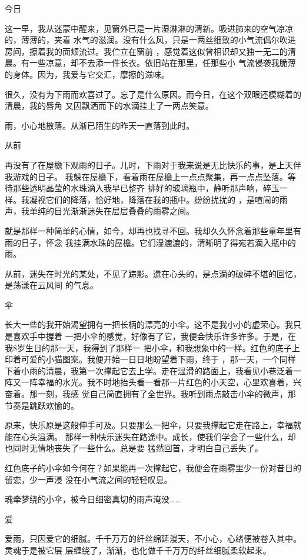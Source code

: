\documentclass[12pt,a4paper]{article}
\newcommand{\subpart}[1]{
	\begingroup \par
	\vspace{1ex} \centering #1
	\par \endgroup \nopagebreak[4]
}
\begin{document}
		\subpart{今日}
		这一早，我从迷蒙中醒来，见窗外已是一片湿淋淋的清新。吸进肺来的空气凉凉的，薄薄的，夹着
	水气的滋润。没有什么风，只是一两丝细致的小气流偶尔吹进房间，擦着我的面颊流过。我伫立在窗前
	，感觉着这似曾相识却又独一无二的清晨。有一些凉意，却不去添一件长衣。依旧站在那里，任那些小
	气流侵袭我脆薄的身体。因为，我爱与它交汇，摩擦的滋味。

		很久，没有为下雨而欢喜过了。忘了是什么原因。而今日，在这个双眼还模糊着的清晨，我的唇角
	又因飘洒而下的水滴挂上了一两点笑意。

		雨，小心地散落。从渐已陌生的昨天一直落到此时。

		\subpart{从前}
		再没有了在屋檐下观雨的日子。儿时，下雨对于我来说是无比快乐的事，是上天伴我游戏的日子。
	我躲在屋檐下，看着雨在屋檐上一点点聚集，再一点点坠落。等待那些透明晶莹的水珠滴入我早已整齐
	排好的玻璃瓶中，静听那声响，碎玉一样。我凝视它们的降落，恰好地，降落在我的瓶中。纷纷扰扰的
	，是喧闹的雨声，我单纯的目光渐渐迷失在层层叠叠的雨雾之间。

		就是那样一种简单的心情，如今，却再也找寻不回。我却久久怀念着那些童年里有雨的日子，怀念
	我挂满水珠的屋檐。它们湿漉漉的，清晰明了得宛若滴入瓶中的雨。

		从前，迷失在时光的某处，不见了踪影。遗在心头的，是点滴的破碎不堪的回忆，是荡漾在云风间
	的气息。

		\subpart{伞}
		长大一些的我开始渴望拥有一把长柄的漂亮的小伞。这不是我小小的虚荣心。我只是喜欢手中握着
	一把小伞的感觉，好像有了它，我便会快乐许多许多。于是，在我8岁生日的那一天，我得到了那样一
	把小伞，和我想象中的一样。红色的底子上印着可爱的小猫图案。我便开始一日日地盼望着下雨，终于
	，那一天，一个同样下着小雨的清晨，我第一次撑起它去上学。走在湿滑的路面上，我看见小巷泛着一
	阵又一阵幸福的水光。我不时地抬头看一看那一片红色的小天空，心里欢喜着，兴奋着。那一刻，我感
	觉自己简直拥有了全世界。我听到雨点敲击小伞的微声，那节奏是跳跃欢愉的。

		原来，快乐原是这般伸手可及。只要那么一把伞，只要我撑起它走在路上，幸福就能在心头溢满。
	那样一种快乐迷失在路途中。成长，使我们学会了一些什么，却也同时无情地丧失了一些什么。总是要
	猛然回首，才明白自己丢失了。

		红色底子的小伞如今何在？如果能再一次撑起它，我便会在雨雾里少一份对昔日的留恋，少一声浸
	没在小气流之间的轻轻叹息。

		魂牵梦绕的小伞，被今日细密真切的雨声淹没……

		\subpart{爱}
		爱雨，只因爱它的细腻。千千万万的纤丝绵延漫天，不小心，心绪便被卷入其中。灵魂于是被它层
	层缠绕了，渐渐，也化做千千万万的纤丝细腻柔软起来。
\end{document}
